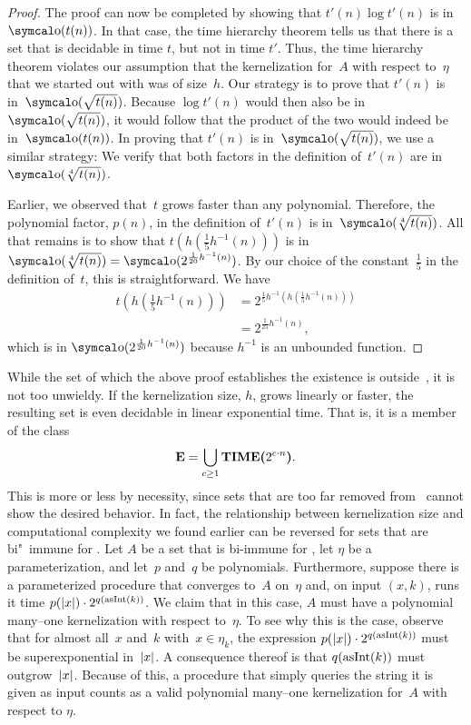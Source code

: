 \begin{proof}
  The proof can now be completed by showing that $t'(n) \log t'(n)$ is in $\littleo(t(n))$.
  In that case, the time hierarchy theorem tells us that there is a set that is decidable in time $t$, but not in time $t'$.
  Thus, the time hierarchy theorem violates our assumption that the kernelization for~$A$ with respect to~$\eta$ that we started out with was of size~$h$.
  Our strategy is to prove that $t'(n)$ is in~$\littleo(\sqrt{t(n)})$.
  Because $\log t'(n)$ would then also be in~$\littleo(\sqrt{t(n)})$, it would follow that the product of the two would indeed be in~$\littleo(t(n))$.
  In proving that $t'(n)$ is in~$\littleo(\sqrt{t(n)})$, we use a similar strategy:
  We verify that both factors in the definition of~$t'(n)$ are in~$\littleo(\sqrt[4]{t(n)})$.

  Earlier, we observed that~$t$ grows faster than any polynomial.
  Therefore, the polynomial factor, $p(n)$, in the definition of~$t'(n)$ is in~$\littleo(\sqrt[4]{t(n)})$.
  All that remains is to show that $t(h(\frac{1}{5} h^{-1}(n)))$ is in $\littleo(\sqrt[4]{t(n)}) = \littleo(2^{\frac{1}{20} h^{-1}(n)})$.
  By our choice of the constant~$\frac{1}{5}$ in the definition of~$t$, this is straightforward.
  We have
  \begin{align*}
    t(h(\tfrac{1}{5} h^{-1}(n))) &= 2^{\frac{1}{5} h^{-1}(h(\frac{1}{5} h^{-1}(n)))} \\
      &= 2^{\frac{1}{25} h^{-1}(n)},
  \end{align*}
  which is in $\littleo(2^{\frac{1}{20} h^{-1}(n)})$ because $h^{-1}$ is an unbounded function.
\end{proof}

While the set of which the above proof establishes the existence is outside~, it is not too unwieldy.
If the kernelization size, $h$, grows linearly or faster, the resulting set is even decidable in linear exponential time.
That is, it is a member of the class
\begin{equation*}
  \textnormal{\textbf{E}} = \bigcup_{c \ge 1} \textnormal{\textbf{TIME($2^{c \cdot n}$)}}.
\end{equation*}
This is more or less by necessity, since sets that are too far removed from~ cannot show the desired behavior.
In fact, the relationship between kernelization size and computational complexity we found earlier can be reversed for sets that are bi"~immune for .
Let $A$ be a set that is bi-immune for , let $\eta$ be a parameterization, and let~$p$ and~$q$ be polynomials.
Furthermore, suppose there is a parameterized procedure that converges to~$A$ on~$\eta$ and, on input $(x, k)$, runs it time $p({\lvert x\rvert}) \cdot 2^{q(\operatorname{asInt}(k))}$.
We claim that in this case, $A$ must have a polynomial many--one kernelization with respect to~$\eta$.
To see why this is the case, observe that for almost all~$x$ and~$k$ with~$x \in \eta_k$, the expression $p({\lvert x\rvert}) \cdot 2^{q(\operatorname{asInt}(k))}$ must be superexponential in~${\lvert x\rvert}$.
A consequence thereof is that $q(\operatorname{asInt}(k))$ must outgrow~${\lvert x\rvert}$.
Because of this, a procedure that simply queries the string it is given as input counts as a valid polynomial many--one kernelization for~$A$ with respect to $\eta$.

